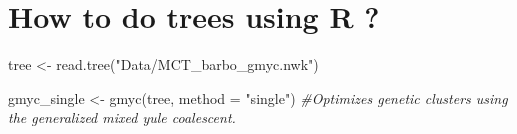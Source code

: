 \documentclass[
]{book}
\newenvironment{Shaded}{\begin{snugshade}}{\end{snugshade}}
\newcommand{\AttributeTok}[1]{\textcolor[rgb]{0.77,0.63,0.00}{#1}}
\newcommand{\CommentTok}[1]{\textcolor[rgb]{0.56,0.35,0.01}{\textit{#1}}}
\newcommand{\FunctionTok}[1]{\textcolor[rgb]{0.00,0.00,0.00}{#1}}
\newcommand{\NormalTok}[1]{#1}
\newcommand{\OtherTok}[1]{\textcolor[rgb]{0.56,0.35,0.01}{#1}}
\newcommand{\StringTok}[1]{\textcolor[rgb]{0.31,0.60,0.02}{#1}}
\begin{document}
\hypertarget{how-to-do-trees-using-r}{%
\section*{How to do trees using R ?}\label{how-to-do-trees-using-r}}

\begin{Shaded}
\begin{Highlighting}[]
\NormalTok{tree }\OtherTok{\textless{}{-}} \FunctionTok{read.tree}\NormalTok{(}\StringTok{"Data/MCT\_barbo\_gmyc.nwk"}\NormalTok{)}

\NormalTok{gmyc\_single }\OtherTok{\textless{}{-}} \FunctionTok{gmyc}\NormalTok{(tree, }\AttributeTok{method =} \StringTok{"single"}\NormalTok{) }\CommentTok{\#Optimizes genetic clusters using the generalized mixed yule coalescent.}
\end{Highlighting}
\end{Shaded}
\end{document}
